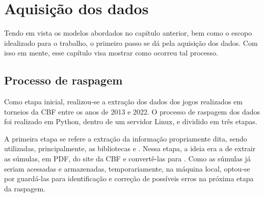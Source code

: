 \chapter{Aquisição dos dados}
\label{aquisicao}

Tendo em vista os modelos abordados no capítulo anterior, bem como o escopo idealizado para o trabalho, o primeiro passo se dá pela aquisição dos dados. Com isso em mente, esse capítulo visa mostrar como ocorreu tal processo.

\section{Processo de raspagem}

Como etapa inicial, realizou-se a extração dos dados dos jogos realizados em torneios da CBF \cite{cbf} entre os anos de 2013 e 2022. O processo de raspagem dos dados foi realizado em Python, dentro de um servidor Linux, e dividido em três etapas.

A primeira etapa se refere a extração da informação propriamente dita, sendo utilizadas, principalmente, as bibliotecas  e . Nessa etapa, a ideia era a de extrair as súmulas, em PDF, do site da CBF e convertê-las para . Como as súmulas já seriam acessadas e armazenadas, temporariamente, na máquina local, optou-se por guardá-las para identificação e correção de possíveis erros na próxima etapa da raspagem.

